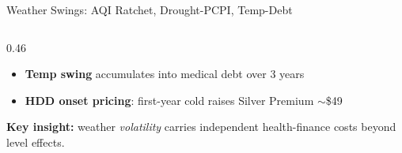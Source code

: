 \documentclass[aspectratio=169,11pt]{beamer}
\newcommand{\emphcolor}[1]{{\color{WarmOrange}\textbf{#1}}}
\newcommand{\graytext}[1]{{\color{WarmGray}#1}}
\begin{document}
\begin{frame}{Weather Swings: AQI Ratchet, Drought-PCPI, Temp-Debt}
\begin{columns}[T]
\begin{column}{0.46\textwidth}
\begin{itemize}
        \item \emphcolor{Temp swing} accumulates into medical debt over 3 years
        \item \emphcolor{HDD onset pricing}: first-year cold raises Silver Premium \(\sim\)\$49
      \end{itemize}
      \vspace{0.25em}
      \graytext{\scriptsize \textbf{Key insight:} weather \emph{volatility} carries independent health-finance costs beyond level effects.}
    \end{column}
  \end{columns}
\end{frame}

\end{document}

